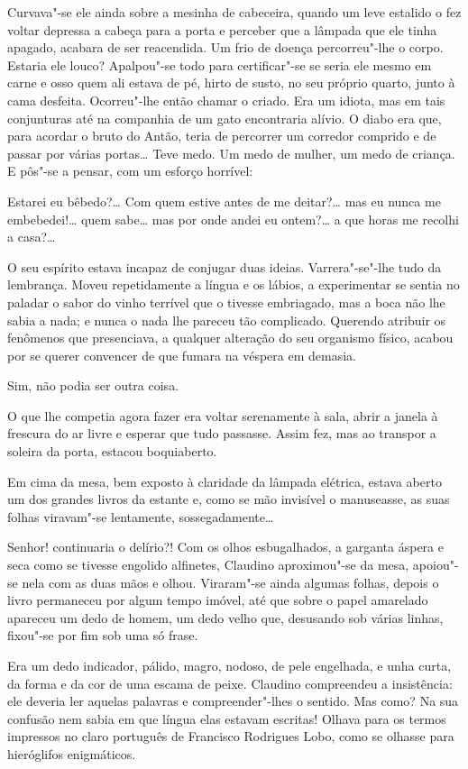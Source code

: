 Curvava"-se ele ainda sobre a mesinha de cabeceira, quando um leve
estalido o fez voltar depressa a cabeça para a porta e perceber que a
lâmpada que ele tinha apagado, acabara de ser reacendida. Um frio de
doença percorreu"-lhe o corpo. Estaria ele louco? Apalpou"-se todo para
certificar"-se se seria ele mesmo em carne e osso quem ali estava de pé,
hirto de susto, no seu próprio quarto, junto à cama desfeita.
Ocorreu"-lhe então chamar o criado. Era um idiota, mas em tais
conjunturas até na companhia de um gato encontraria alívio. O diabo era
que, para acordar o bruto do Antão, teria de percorrer um corredor
comprido e de passar por várias portas\ldots{} Teve medo. Um medo de mulher,
um medo de criança. E pôs"-se a pensar, com um esforço horrível:

Estarei eu bêbedo?\ldots{} Com quem estive antes de me deitar?\ldots{} mas eu
nunca me embebedei!\ldots{} quem sabe\ldots{} mas por onde andei eu ontem?\ldots{} a
que horas me recolhi a casa?\ldots{}

O seu espírito estava incapaz de conjugar duas ideias. Varrera"-se"-lhe
tudo da lembrança. Moveu repetidamente a língua e os lábios, a
experimentar se sentia no paladar o sabor do vinho terrível que o
tivesse embriagado, mas a boca não lhe sabia a nada; e nunca o nada lhe
pareceu tão complicado. Querendo atribuir os fenômenos que presenciava,
a qualquer alteração do seu organismo físico, acabou por se querer
convencer de que fumara na véspera em demasia.

Sim, não podia ser outra coisa.

O que lhe competia agora fazer era voltar serenamente à sala, abrir a
janela à frescura do ar livre e esperar que tudo passasse. Assim fez,
mas ao transpor a soleira da porta, estacou boquiaberto.

Em cima da mesa, bem exposto à claridade da lâmpada elétrica, estava
aberto um dos grandes livros da estante e, como se mão invisível o
manuseasse, as suas folhas viravam"-se lentamente, sossegadamente\ldots{}

Senhor! continuaria o delírio?! Com os olhos esbugalhados, a garganta
áspera e seca como se tivesse engolido alfinetes, Claudino aproximou"-se
da mesa, apoiou"-se nela com as duas mãos e olhou. Viraram"-se ainda
algumas folhas, depois o livro permaneceu
por algum tempo imóvel, até que sobre o papel amarelado apareceu um dedo
de homem, um dedo velho que, desusando sob várias linhas, fixou"-se por
fim sob uma só frase.

Era um dedo indicador, pálido, magro, nodoso, de pele engelhada, e unha
curta, da forma e da cor de uma escama de peixe. Claudino compreendeu a
insistência: ele deveria ler aquelas palavras e compreender"-lhes o
sentido. Mas como? Na sua confusão nem sabia em que língua elas estavam
escritas! Olhava para os termos impressos no claro português de
Francisco Rodrigues Lobo, como se olhasse para hieróglifos enigmáticos.


